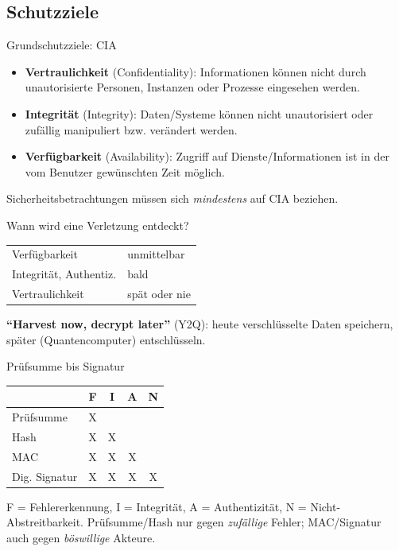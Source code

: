 \documentclass[a4paper, fontsize=7pt]{scrartcl}
\renewcommand*{\arraystretch}{1.5}  %
\begin{document}
\subsection{Schutzziele}

\begin{mainbox}{Grundschutzziele: CIA}
\begin{itemize}
    \item \textbf{Vertraulichkeit} (Confidentiality): Informationen können nicht durch
          unautorisierte Personen, Instanzen oder Prozesse eingesehen werden.
    \item \textbf{Integrität} (Integrity): Daten/Systeme können nicht unautorisiert
          oder zufällig manipuliert bzw. verändert werden.
    \item \textbf{Verfügbarkeit} (Availability): Zugriff auf Dienste/Informationen ist
          in der vom Benutzer gewünschten Zeit möglich.
\end{itemize}
Sicherheitsbetrachtungen müssen sich \emph{mindestens} auf CIA beziehen.
\end{mainbox}

\begin{mainbox}{Wann wird eine Verletzung entdeckt?}
\renewcommand*{\arraystretch}{1.3}
\begin{center}
\begin{tabular}{l|l}
Verfügbarkeit & unmittelbar \\
Integrität, Authentiz. & bald \\
Vertraulichkeit & spät oder nie \\
\end{tabular}
\end{center}
\textbf{``Harvest now, decrypt later''} (Y2Q): heute verschlüsselte Daten
speichern, später (Quantencomputer) entschlüsseln.
\end{mainbox}

\begin{mainbox}{Prüfsumme bis Signatur}
\renewcommand*{\arraystretch}{1.3}
\begin{center}
\begin{tabular}{l|c|c|c|c}
 & \textbf{F} & \textbf{I} & \textbf{A} & \textbf{N} \\
\hline
Prüfsumme & X & & & \\
Hash & X & X & & \\
MAC & X & X & X & \\
Dig. Signatur & X & X & X & X \\
\end{tabular}
\end{center}
F = Fehlererkennung, I = Integrität, A = Authentizität,
N = Nicht-Abstreitbarkeit.
Prüfsumme/Hash nur gegen \emph{zufällige} Fehler; MAC/Signatur auch gegen
\emph{böswillige} Akteure.
\end{mainbox}
\end{document}
